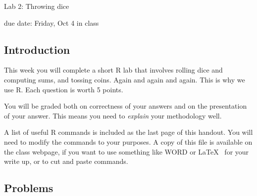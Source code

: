 \documentclass{report}
\begin{document}
{\bf \centerline{{\large Lab 2: Throwing dice}}}

\centerline{due date: Friday, Oct 4 in class}

\bigskip

\subsection*{Introduction}

This week you will complete a short R lab that involves rolling dice and computing sums,
and tossing coins.  Again and again and again.  This is why we use R.  Each question
is worth 5 points.

You will be graded both on correctness of your answers and on the presentation of
your answer.  This means you need to \emph{explain} your methodology well.

A list of useful R commands is included as the last page of this handout.  You will
need to modify the commands to your purposes.  A copy of this file is available
on the class webpage, if you want to use something like WORD or \LaTeX 
~for your write up, 
or to cut and paste commands.

\subsection*{Problems}
\end{document}
